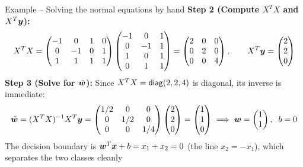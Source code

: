 \documentclass[aspectratio=169]{beamer}\usepackage[]{graphicx}\usepackage[]{xcolor}
\begin{document}
\begin{frame}{Example -- Solving the normal equations by hand}
    \textbf{Step 2 (Compute $X^T X$ and $X^T \bm{y}$):}
    \[
        X^T X = \begin{pmatrix}
            -1 & 0 & 1 & 0 \\
             0 & -1 & 0 & 1 \\
             1 & 1 & 1 & 1
        \end{pmatrix}
        \begin{pmatrix}
            -1 & 0 & 1 \\
             0 & -1 & 1 \\
             1 & 0 & 1 \\
             0 & 1 & 1
        \end{pmatrix}
        = \begin{pmatrix}
            2 & 0 & 0 \\
            0 & 2 & 0 \\
            0 & 0 & 4
        \end{pmatrix}, \qquad
        X^T \bm{y} = \begin{pmatrix} 2 \\ 2 \\ 0 \end{pmatrix}
    \]
    \vfill
    \textbf{Step 3 (Solve for $\tilde{\bm{w}}$):} Since $X^T X = \mathsf{diag}(2, 2, 4)$ is diagonal, its inverse is immediate:
    \[
        \tilde{\bm{w}} = (X^T X)^{-1} X^T \bm{y} = \begin{pmatrix} 1/2 & 0 & 0 \\ 0 & 1/2 & 0 \\ 0 & 0 & 1/4 \end{pmatrix} \begin{pmatrix} 2 \\ 2 \\ 0 \end{pmatrix} = \begin{pmatrix} 1 \\ 1 \\ 0 \end{pmatrix}
        \implies \bm{w} = \begin{pmatrix} 1 \\ 1 \end{pmatrix}, \;\; b = 0
    \]
    \vfill
    The decision boundary is $\bm{w}^T \bm{x} + b = x_1 + x_2 = 0$ (the line $x_2 = -x_1$), which separates the two classes cleanly
\end{frame}
\end{document}

